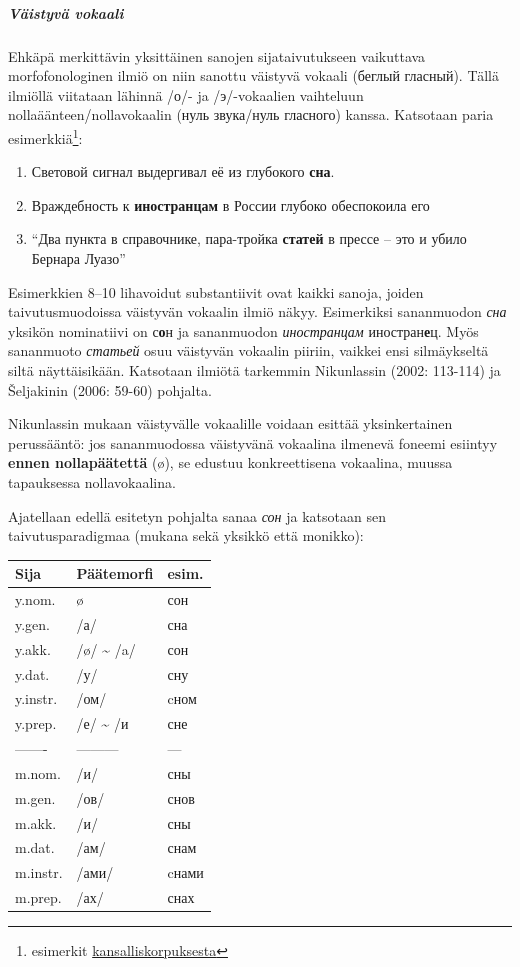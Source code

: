 \documentclass[]{scrreprt}
\providecommand{\tightlist}{%
  \setlength{\itemsep}{0pt}\setlength{\parskip}{0pt}}
\begin{document}
\subparagraph{Väistyvä vokaali}\label{vuxe4istyvuxe4-vokaali}

Ehkäpä merkittävin yksittäinen sanojen sijataivutukseen vaikuttava
morfofonologinen ilmiö on niin sanottu väistyvä vokaali (беглый
гласный). Tällä ilmiöllä viitataan lähinnä /о/- ja /э/-vokaalien
vaihteluun nollaäänteen/nollavokaalin (нуль звука/нуль гласного) kanssa.
Katsotaan paria esimerkkiä\footnote{esimerkit
  \href{http://ruscorpora.ru}{kansalliskorpuksesta}}:

\begin{enumerate}
\def\labelenumi{(\arabic{enumi})}
\setcounter{enumi}{7}
\tightlist
\item
  Световой сигнал выдергивал её из глубокого \textbf{сна}.
\item
  Враждебность к \textbf{иностранцам} в России глубоко обеспокоила его
\item
  ``Два пункта в справочнике, пара-тройка \textbf{статей} в прессе --
  это и убило Бернара Луазо''
\end{enumerate}

Esimerkkien 8--10 lihavoidut substantiivit ovat kaikki sanoja, joiden
taivutusmuodoissa väistyvän vokaalin ilmiö näkyy. Esimerkiksi
sananmuodon \emph{сна} yksikön nominatiivi on с\textbf{о}н ja
sananmuodon \emph{иностранцам} иностран\textbf{е}ц. Myös sananmuoto
\emph{статьей} osuu väistyvän vokaalin piiriin, vaikkei ensi
silmäykseltä siltä näyttäisikään. Katsotaan ilmiötä tarkemmin
Nikunlassin (2002: 113-114) ja Šeljakinin (2006: 59-60) pohjalta.

Nikunlassin mukaan väistyvälle vokaalille voidaan esittää yksinkertainen
perussääntö: jos sananmuodossa väistyvänä vokaalina ilmenevä foneemi
esiintyy \textbf{ennen nollapäätettä} (ø), se edustuu konkreettisena
vokaalina, muussa tapauksessa nollavokaalina.

Ajatellaan edellä esitetyn pohjalta sanaa \emph{сон} ja katsotaan sen
taivutusparadigmaa (mukana sekä yksikkö että monikko):

\begin{longtable}[c]{@{}lll@{}}
\toprule
Sija & Päätemorfi & esim.\tabularnewline
\midrule
\endhead
y.nom. & ø & сон\tabularnewline
y.gen. & /а/ & сна\tabularnewline
y.akk. & /ø/ \textasciitilde{} /a/ & сон\tabularnewline
y.dat. & /у/ & сну\tabularnewline
y.instr. & /ом/ & cном\tabularnewline
y.prep. & /е/ \textasciitilde{} /и & сне\tabularnewline
------- & --------- & ---\tabularnewline
m.nom. & /и/ & сны\tabularnewline
m.gen. & /ов/ & снов\tabularnewline
m.akk. & /и/ & сны\tabularnewline
m.dat. & /ам/ & снам\tabularnewline
m.instr. & /ами/ & cнами\tabularnewline
m.prep. & /ах/ & снах\tabularnewline
\bottomrule
\end{longtable}
\end{document}
